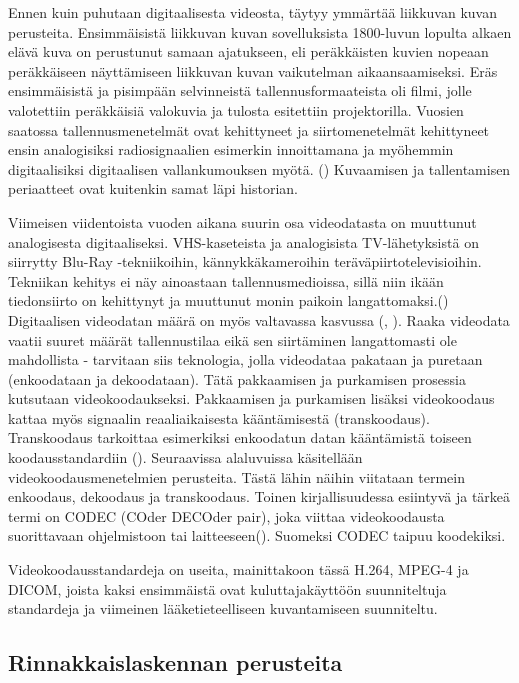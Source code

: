 Ennen kuin puhutaan digitaalisesta videosta, täytyy ymmärtää liikkuvan kuvan
perusteita. Ensimmäisistä liikkuvan kuvan sovelluksista 1800-luvun lopulta
alkaen elävä kuva on perustunut samaan ajatukseen, eli peräkkäisten kuvien
nopeaan peräkkäiseen näyttämiseen liikkuvan kuvan vaikutelman aikaansaamiseksi.
Eräs ensimmäisistä ja pisimpään selvinneistä tallennusformaateista oli filmi,
jolle valotettiin peräkkäisiä valokuvia ja tulosta esitettiin projektorilla.
Vuosien saatossa tallennusmenetelmät ovat kehittyneet ja siirtomenetelmät
kehittyneet ensin analogisiksi radiosignaalien esimerkin innoittamana ja
myöhemmin digitaalisiksi digitaalisen vallankumouksen myötä. (\citealt{mitra})
Kuvaamisen ja tallentamisen periaatteet ovat kuitenkin samat läpi
historian.

Viimeisen viidentoista vuoden aikana suurin osa videodatasta on muuttunut
analogisesta digitaaliseksi. VHS-kaseteista ja analogisista TV-lähetyksistä
on siirrytty Blu-Ray -tekniikoihin, kännykkäkameroihin
teräväpiirtotelevisioihin. Tekniikan kehitys ei näy ainoastaan tallennusmedioissa,
sillä niin ikään tiedonsiirto on kehittynyt ja muuttunut monin paikoin
langattomaksi.(\citealt{h264})
Digitaalisen videodatan määrä on myös valtavassa kasvussa (\citealt{cisco}, \citealt{youtube}).
Raaka videodata vaatii suuret määrät tallennustilaa eikä sen siirtäminen
langattomasti ole mahdollista - tarvitaan siis teknologia, jolla videodataa pakataan ja puretaan
(enkoodataan ja dekoodataan). Tätä pakkaamisen ja purkamisen prosessia
kutsutaan videokoodaukseksi. Pakkaamisen ja purkamisen lisäksi videokoodaus kattaa
myös signaalin reaaliaikaisesta kääntämisestä (transkoodaus). Transkoodaus
tarkoittaa esimerkiksi enkoodatun datan kääntämistä toiseen koodausstandardiin (\citealt{mpeg_app}).
Seuraavissa alaluvuissa käsitellään videokoodausmenetelmien perusteita. Tästä lähin näihin viitataan termein
enkoodaus, dekoodaus ja transkoodaus. Toinen kirjallisuudessa esiintyvä ja
tärkeä termi on CODEC (COder DECOder pair), joka viittaa videokoodausta suorittavaan
ohjelmistoon tai laitteeseen(\citealt{h264}). Suomeksi CODEC taipuu koodekiksi.

Videokoodausstandardeja on useita, mainittakoon tässä H.264, MPEG-4 ja DICOM,
joista kaksi ensimmäistä ovat kuluttajakäyttöön suunniteltuja standardeja
ja viimeinen lääketieteelliseen kuvantamiseen suunniteltu.

\subsection{Rinnakkaislaskennan perusteita}

